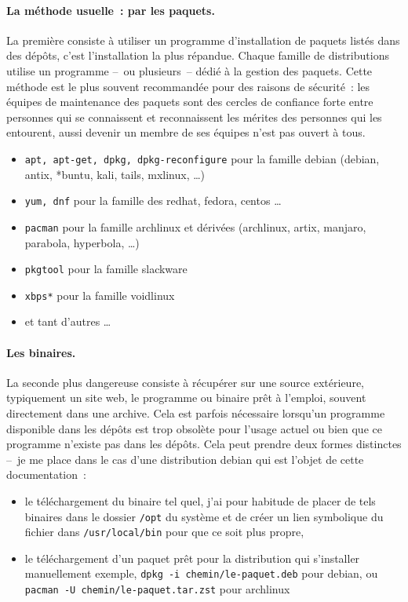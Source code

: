 \documentclass[12pt, a4paper]{report}
\begin{document}
\paragraph{La méthode usuelle~: par les paquets.}
La première consiste à utiliser un programme d'installation de paquets listés dans des dépôts, c'est l'installation la plus répandue. Chaque famille de distributions utilise un programme --~ou plusieurs~-- dédié à la gestion des paquets. Cette méthode est le plus souvent recommandée pour des raisons de sécurité~: les équipes de maintenance des paquets sont des cercles de confiance forte entre personnes qui se connaissent et reconnaissent les mérites des personnes qui les entourent, aussi devenir un membre de ses équipes n'est pas ouvert à tous.
\begin{itemize}
	\item \texttt{apt, apt-get, dpkg, dpkg-reconfigure} pour la famille debian (debian, antix, *buntu, kali, tails, mxlinux, \ldots)
	\item \texttt{yum, dnf} pour la famille des redhat, fedora, centos \ldots
	\item \texttt{pacman} pour la famille archlinux et dérivées (archlinux, artix, manjaro, parabola, hyperbola, \ldots)
	\item \texttt{pkgtool} pour la famille slackware
	\item \texttt{xbps*} pour la famille voidlinux
	\item et tant d'autres \ldots
\end{itemize}

\paragraph{Les binaires.}
La seconde plus dangereuse consiste à récupérer sur une source extérieure, typiquement un site web, le programme ou binaire prêt à l'emploi, souvent directement dans une archive. Cela est parfois nécessaire lorsqu'un programme disponible dans les dépôts est trop obsolète pour l'usage actuel ou bien que ce programme n'existe pas dans les dépôts. Cela peut prendre deux formes distinctes --~je me place dans le cas d'une distribution debian qui est l'objet de cette documentation~:
\begin{itemize}
	\item le téléchargement du binaire tel quel, j'ai pour habitude de placer de tels binaires dans le dossier \texttt{/opt} du système et de créer un lien symbolique du fichier dans \texttt{/usr/local/bin} pour que ce soit plus propre,
	\item le téléchargement d'un paquet prêt pour la distribution qui s'installer manuellement exemple, \newline
	\texttt{dpkg -i chemin/le-paquet.deb} pour debian, \newline
	ou \texttt{pacman -U chemin/le-paquet.tar.zst} pour archlinux
\end{itemize}
\end{document}
